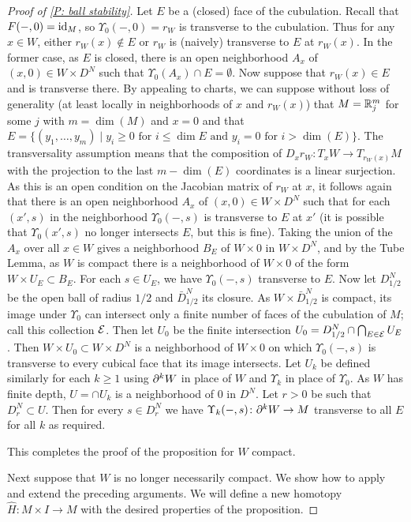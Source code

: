 \begin{proof}[Proof of \cref{P: ball stability}]
	Let $E$ be a (closed) face of the cubulation.
	Recall that $F(-,0) = \mathrm{id}_M$, so $\Upsilon_0(-,0) = r_W$ is transverse to the cubulation.
	Thus for any $x \in W$, either $r_W(x)\notin E$ or $r_W$ is (naively) transverse to $E$ at $r_W(x)$.
	In the former case, as $E$ is closed, there is an open neighborhood $A_x$ of $(x,0) \in W \times D^N$ such that $\Upsilon_0(A_x) \cap E = \emptyset$.
	Now suppose that $r_W(x) \in E$ and is transverse there.
	By appealing to charts, we can suppose without loss of generality (at least locally in neighborhoods of $x$ and $r_W(x)$) that $M = \mathbb{R}_j^m$ for some $j$ with $m = \dim(M)$ and $x = 0$ and that $E = \{(y_1,\ldots,y_m) \mid y_i\geq 0\text{ for } i \leq \dim E\text{ and } y_i = 0 \text{ for } i>\dim(E)\}$.
	The transversality assumption means that the composition of $D_xr_W \colon T_xW \to T_{r_W(x)}M$ with the projection to the last $m-\dim(E)$ coordinates is a linear surjection.
	As this is an open condition on the Jacobian matrix of $r_W$ at $x$, it follows again that there is an open neighborhood $A_x$ of $(x,0) \in W \times D^N$ such that for each $(x',s)$ in the neighborhood $\Upsilon_0(-,s)$ is transverse to $E$ at $x'$ (it is possible that $\Upsilon_0(x',s)$ no longer intersects $E$, but this is fine).
	Taking the union of the $A_x$ over all $x \in W$ gives a neighborhood $B_E$ of $W \times 0$ in $W \times D^N$, and by the Tube Lemma, as $W$ is compact there is a neighborhood of $W \times 0$ of the form $W \times U_E \subset B_E$.
	For each $s \in U_E$, we have $\Upsilon_0(-,s)$ transverse to $E$.
	Now let $D^N_{1/2}$ be the open ball of radius $1/2$ and $\bar D^N_{1/2}$ its closure.
	As $W \times \bar D^N_{1/2}$ is compact, its image under $\Upsilon_0$ can intersect only a finite number of faces of the cubulation of $M$; call this collection $\mathcal{E}$.
	Then let $U_0$ be the finite intersection $U_0 = D^N_{1/2} \cap \bigcap_{E\in\mathcal{E}} U_E$.
	Then $W \times U_0 \subset W \times D^N$ is a neighborhood of $W \times 0$ on which $\Upsilon_0(-,s)$ is transverse to every cubical face that its image intersects.
	Let $U_k$ be defined similarly for each $k\geq 1$ using $\partial^kW$ in place of $W$ and $\Upsilon_k$ in place of $\Upsilon_0$.
	As $W$ has finite depth, $U = \cap U_k$ is a neighborhood of $0$ in $D^N$.
	Let $r>0$ be such that $D^N_r \subset U$.
	Then for every $s \in D^N_r$ we have $\Upsilon_k(-,s) \colon \partial^kW \to M$ transverse to all $E$ for all $k$ as required.

	This completes the proof of the proposition for $W$ compact.

	Next suppose that $W$ is no longer necessarily compact.
	We show how to apply and extend the preceding arguments.
	We will define a new homotopy $\hat H \colon M \times I \to M$ with the desired properties of the proposition.


\end{proof}
